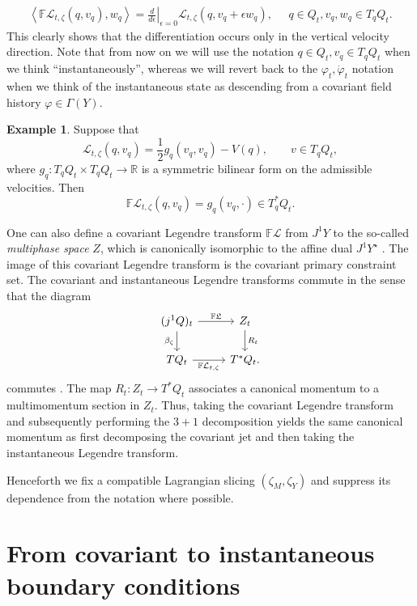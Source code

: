 \documentclass{article}
\newcommand{\R}{\mathbb{R}}
\theoremstyle{definition}
\newtheorem{example}[definition]{Example}
\begin{document}
\begin{align*}
    \left\langle
\mathbb F\mathcal L_{t,\zeta}(q,v_q),w_q
\right\rangle
\left.=\frac{d}{d\epsilon}\right|_{\epsilon=0}
\mathcal L_{t,\zeta}(q,v_q+\epsilon w_q),\;\;\;\;\; q\in Q_t, v_q,w_q\in T_qQ_t.
\end{align*}
This clearly shows that the differentiation occurs only in the vertical velocity direction. Note that from now on we will use the notation $q\in Q_t,v_q\in T_qQ_t$ when we think ``instantaneously'', whereas we will revert back to the $\varphi_t,\dot{\varphi}_t$ notation when we think of the instantaneous state as descending from a covariant field history $\varphi\in \Gamma(Y)$.
\begin{example}\label{ex:kineticlegendre}
Suppose that
\[
\mathcal L_{t,\zeta}(q,v_q)
=
\frac12 g_q(v_q,v_q)-V(q),
\qquad v\in T_qQ_t,
\]
where \(g_q\colon T_qQ_t\times T_qQ_t\to\R\) is a symmetric bilinear form on the admissible velocities.
Then \cite{binz}
\[
\mathbb F\mathcal L_{t,\zeta}(q,v_q)
=
g_q(v_q,\cdot)\in T_q^*Q_t.
\]
\end{example}
One can also define a covariant Legendre transform $\mathbb{F}\mathcal{L}$ from $J^1Y$ to the so-called \textit{multiphase space} $Z$, which is canonically isomorphic to the affine dual $J^1Y^\star$ \cite{gotayMomentumMapsClassical2004}. The image of this covariant Legendre transform is the covariant primary constraint set. The covariant and instantaneous Legendre transforms commute in the sense that the diagram
\begin{equation}\label{eq:legendre-square}
\begin{tikzcd}
(j^1Q)_t
    \arrow[r, "\mathbb{F}\mathfrak{L}"]
    \arrow[d, "\beta_\zeta"']
&
Z_t
    \arrow[d, "R_t"]
\\
TQ_t
    \arrow[r, "\mathbb{F}\mathcal{L}_{t,\zeta}"']
&
T^*Q_t .
\end{tikzcd}
\end{equation}
commutes \cite{gotayMomentumMapsClassical2004a}. The map
$R_t\colon Z_t\to T^*Q_t$ associates a canonical momentum to a multimomentum section in $Z_t$. Thus, taking the covariant Legendre transform and subsequently performing the $3+1$ decomposition yields the same canonical momentum as first decomposing the covariant jet and then taking the instantaneous Legendre transform. 

Henceforth we fix a compatible Lagrangian slicing $(\zeta_M,\zeta_Y)$ and suppress its
dependence from the notation where possible.

\section{From covariant to instantaneous boundary conditions}\label{sec:BCs}
\end{document}
